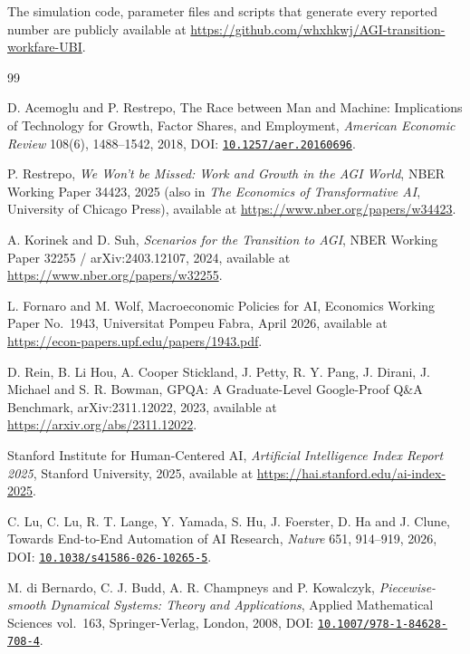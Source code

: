 \documentclass[review,12pt]{elsarticle}
\theoremstyle{plain}
\theoremstyle{definition}
\theoremstyle{remark}
\begin{document}
The simulation code, parameter files and scripts that generate every reported number are publicly available at \url{https://github.com/whxhkwj/AGI-transition-workfare-UBI}.
\begin{thebibliography}{99}

 D. Acemoglu and P. Restrepo, The Race between Man and Machine: Implications of Technology for Growth, Factor Shares, and Employment, \emph{American Economic Review} 108(6), 1488--1542, 2018, DOI: \href{https://doi.org/10.1257/aer.20160696}{\texttt{10.1257/aer.20160696}}.

 P. Restrepo, \emph{We Won't be Missed: Work and Growth in the AGI World}, NBER Working Paper 34423, 2025 (also in \emph{The Economics of Transformative AI}, University of Chicago Press), available at \url{https://www.nber.org/papers/w34423}.

 A. Korinek and D. Suh, \emph{Scenarios for the Transition to AGI}, NBER Working Paper 32255 / arXiv:2403.12107, 2024, available at \url{https://www.nber.org/papers/w32255}.

 L. Fornaro and M. Wolf, Macroeconomic Policies for AI, Economics Working Paper No.~1943, Universitat Pompeu Fabra, April 2026, available at \url{https://econ-papers.upf.edu/papers/1943.pdf}.

 D. Rein, B. Li Hou, A. Cooper Stickland, J. Petty, R. Y. Pang, J. Dirani, J. Michael and S. R. Bowman, GPQA: A Graduate-Level Google-Proof Q\&A Benchmark, arXiv:2311.12022, 2023, available at \url{https://arxiv.org/abs/2311.12022}.

 Stanford Institute for Human-Centered AI, \emph{Artificial Intelligence Index Report 2025}, Stanford University, 2025, available at \url{https://hai.stanford.edu/ai-index-2025}.

 C. Lu, C. Lu, R. T. Lange, Y. Yamada, S. Hu, J. Foerster, D. Ha and J. Clune, Towards End-to-End Automation of AI Research, \emph{Nature} 651, 914--919, 2026, DOI: \href{https://doi.org/10.1038/s41586-026-10265-5}{\texttt{10.1038/s41586-026-10265-5}}.

 M. di Bernardo, C. J. Budd, A. R. Champneys and P. Kowalczyk, \emph{Piecewise-smooth Dynamical Systems: Theory and Applications}, Applied Mathematical Sciences vol.~163, Springer-Verlag, London, 2008, DOI: \href{https://doi.org/10.1007/978-1-84628-708-4}{\texttt{10.1007/978-1-84628-708-4}}.


\end{thebibliography}
\end{document}
